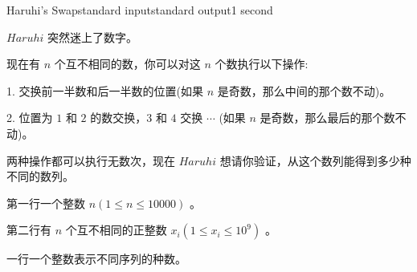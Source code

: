 \begin{problem}{Haruhi's Swap}{standard input}{standard output}{1 second}

$Haruhi$ 突然迷上了数字。

现在有 $n$ 个互不相同的数，你可以对这 $n$ 个数执行以下操作:

1.  交换前一半数和后一半数的位置(如果 $n$ 是奇数，那么中间的那个数不动)。

2.  位置为 $1$ 和 $2$ 的数交换，$3$ 和 $4$ 交换 $\cdots$ (如果 $n$ 是奇数，那么最后的那个数不动)。

两种操作都可以执行无数次，现在 $Haruhi$ 想请你验证，从这个数列能得到多少种不同的数列。

\InputFile

第一行一个整数 $n(1 \leq n \leq 10000)$ 。

第二行有 $n$ 个互不相同的正整数 $x_i(1 \leq x_i \leq 10^9)$ 。

\OutputFile

一行一个整数表示不同序列的种数。

\Examples

\begin{example}
%
\end{example}
\end{problem}
